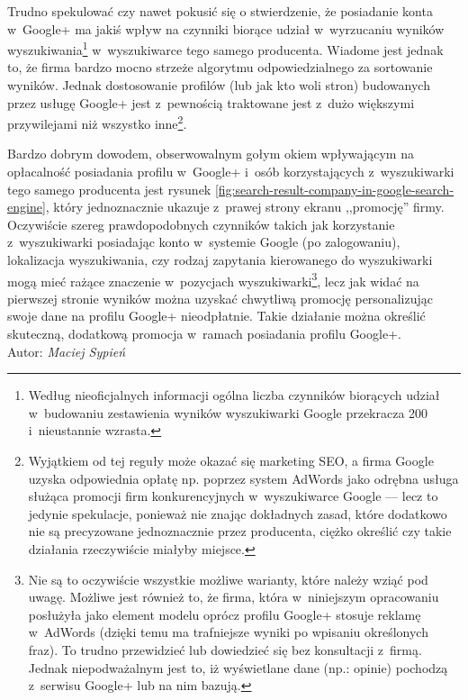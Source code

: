 Trudno spekulować czy nawet pokusić się o stwierdzenie, że posiadanie konta w~Google+ ma jakiś wpływ na czynniki biorące udział w~wyrzucaniu wyników wyszukiwania\footnote{Według nieoficjalnych informacji ogólna liczba czynników biorących udział w~budowaniu zestawienia wyników wyszukiwarki Google przekracza 200 i~nieustannie wzrasta.} w~wyszukiwarce tego samego producenta. Wiadome jest jednak to, że firma bardzo mocno strzeże algorytmu odpowiedzialnego za sortowanie wyników. Jednak dostosowanie profilów (lub jak kto woli stron) budowanych przez usługę Google+ jest z~pewnością traktowane jest z~dużo większymi przywilejami niż wszystko inne\footnote{Wyjątkiem od tej reguły może okazać się marketing SEO, a firma Google uzyska odpowiednia opłatę np. poprzez system AdWords jako odrębna usługa służąca promocji firm konkurencyjnych w~wyszukiwarce Google --- lecz to jedynie spekulacje, ponieważ nie znając dokładnych zasad, które dodatkowo nie są precyzowane jednoznacznie przez producenta, ciężko określić czy takie działania rzeczywiście miałyby miejsce.}.

Bardzo dobrym dowodem, obserwowalnym gołym okiem wpływającym na opłacalność posiadania profilu w~Google+ i~osób korzystających z~wyszukiwarki tego samego producenta jest rysunek \ref{fig:search-result-company-in-google-search-engine}, który jednoznacznie ukazuje z~prawej strony ekranu ,,promocję'' firmy. Oczywiście szereg prawdopodobnych czynników takich jak korzystanie z~wyszukiwarki posiadając konto w~systemie Google (po zalogowaniu), lokalizacja wyszukiwania, czy rodzaj zapytania kierowanego do wyszukiwarki mogą mieć rażące znaczenie w~pozycjach wyszukiwarki\footnote{Nie są to oczywiście wszystkie możliwe warianty, które należy wziąć pod uwagę. Możliwe jest również to, że firma, która w~niniejszym opracowaniu posłużyła jako element modelu oprócz profilu Google+ stosuje reklamę w~AdWords (dzięki temu ma trafniejsze wyniki po wpisaniu określonych fraz). To trudno przewidzieć lub dowiedzieć się bez konsultacji z~firmą. Jednak niepodważalnym jest to, iż wyświetlane dane (np.: opinie) pochodzą z~serwisu Google+ lub na nim bazują.}, lecz jak widać na pierwszej stronie wyników można uzyskać chwytliwą promocję personalizując swoje dane na profilu Google+ nieodpłatnie. Takie działanie można określić skuteczną, dodatkową promocja w~ramach posiadania profilu Google+.\\

\hfill Autor: \textit{Maciej Sypień}